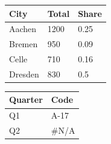 \documentclass[11pt,a4paper]{article}
\begin{document}
\begin{table}[h]
\begin{tabular}{|l|l|l|}
\hline
City & Total & Share \\ \hline
Aachen & 1200 & 0.25 \\ \hline
Bremen & 950 & 0.09 \\ \hline
Celle & 710 & 0.16 \\ \hline
Dresden & 830 & 0.5 \\ \hline
\end{tabular}
\end{table}

\begin{table}[h]
\begin{tabular}{|l|l|}
\hline
Quarter & Code \\ \hline
Q1 & A-17 \\ \hline
Q2 & \#N/A \\ \hline
\end{tabular}
\end{table}
\end{document}
